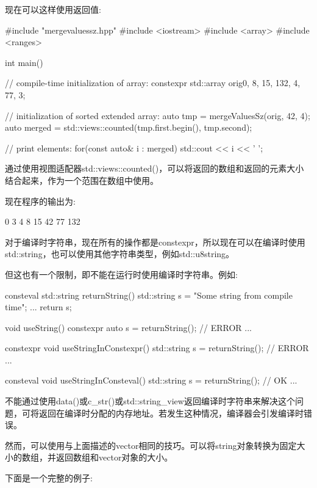 现在可以这样使用返回值:


\begin{cpp}
#include "mergevaluessz.hpp"
#include <iostream>
#include <array>
#include <ranges>

int main()
{
	// compile-time initialization of array:
	constexpr std::array orig{0, 8, 15, 132, 4, 77, 3};

	// initialization of sorted extended array:
	auto tmp = mergeValuesSz(orig, 42, 4);
	auto merged = std::views::counted(tmp.first.begin(), tmp.second);

	// print elements:
	for(const auto& i : merged) {
		std::cout << i << ' ';
	}
}
\end{cpp}

通过使用视图适配器std::views::counted()，可以将返回的数组和返回的元素大小结合起来，作为一个范围在数组中使用。

现在程序的输出为:

\begin{shell}
0 3 4 8 15 42 77 132
\end{shell}


对于编译时字符串，现在所有的操作都是constexpr，所以现在可以在编译时使用std::string，也可以使用其他字符串类型，例如std::u8string。

但这也有一个限制，即不能在运行时使用编译时字符串。例如:

\begin{cpp}
consteval std::string returnString()
{
	std::string s = "Some string from compile time";
	...
	return s;
}

void useString()
{
	constexpr auto s = returnString(); // ERROR
	...
}

constexpr void useStringInConstexpr()
{
	std::string s = returnString(); // ERROR
	...
}

consteval void useStringInConsteval()
{
	std::string s = returnString(); // OK
	...
}
\end{cpp}

不能通过使用data()或c\_str()或std::string\_view返回编译时字符串来解决这个问题，可将返回在编译时分配的内存地址。若发生这种情况，编译器会引发编译时错误。

然而，可以使用与上面描述的vector相同的技巧。可以将string对象转换为固定大小的数组，并返回数组和vector对象的大小。

下面是一个完整的例子:


